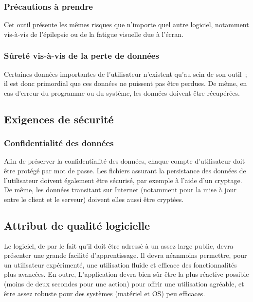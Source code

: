 	\subsubsection{Précautions à prendre}
Cet outil présente les mêmes risques que n'importe quel autre logiciel, notamment vis-à-vis de l'épilepsie ou de la fatigue visuelle due à l'écran.

	\subsubsection{Sûreté vis-à-vis de la perte de données}
Certaines données importantes de l'utilisateur n'existent qu'au sein de son outil~; il est donc primordial que ces données ne puissent pas être perdues.
De même, en cas d'erreur du programme ou du système, les données doivent être récupérées.


	\subsection{Exigences de sécurité}

	\subsubsection{Confidentialité des données}
Afin de préserver la confidentialité des données, chaque compte d'utilisateur doit être protégé par mot de passe.
Les fichiers assurant la persistance des données de l'utilisateur doivent également être sécurisé, par exemple à l'aide d'un cryptage.
De même, les données transitant sur Internet (notamment pour la mise à jour entre le client et le serveur) doivent elles aussi être cryptées.


	\subsection{Attribut de qualité logicielle}


Le logiciel, de par le fait qu'il doit être adressé à un assez large public, devra présenter une grande facilité d'apprentissage.
Il devra néanmoins permettre, pour un utilisateur expérimenté, une utilisation fluide et efficace des fonctionnalités plus avancées.
En outre, L'application devra bien sûr être la plus réactive possible (moins de deux secondes pour une action) pour offrir une utilisation agréable, et être assez robuste pour des systèmes (matériel et OS) peu efficaces.

